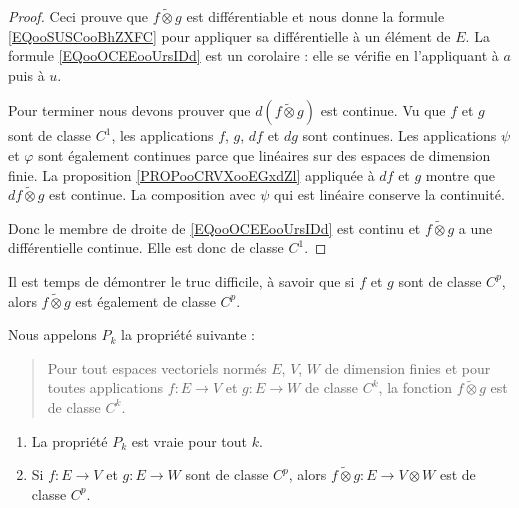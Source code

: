 \begin{proof}
	Ceci prouve que \( f\tilde\otimes g\) est différentiable et nous donne la formule \eqref{EQooSUSCooBhZXFC} pour appliquer sa différentielle à un élément de \( E\). La formule \eqref{EQooOCEEooUrsIDd} est un corolaire : elle se vérifie en l'appliquant à \( a\) puis à \( u\).

	Pour terminer nous devons prouver que \( d(f\tilde\otimes g)\) est continue. Vu que \( f\) et \( g\) sont de classe \( C^1\), les applications \( f\), \( g\), \( df\) et \( dg\) sont continues. Les applications \( \psi\) et \( \varphi\) sont également continues parce que linéaires sur des espaces de dimension finie. La proposition \ref{PROPooCRVXooEGxdZl} appliquée à \( df\) et \( g\) montre que \( df\tilde\otimes g\) est continue. La composition avec \( \psi\) qui est linéaire conserve la continuité.

	Donc le membre de droite de \eqref{EQooOCEEooUrsIDd} est continu et \( f\tilde\otimes g\) a une différentielle continue. Elle est donc de classe \( C^1\).
\end{proof}

Il est temps de démontrer le truc difficile, à savoir que si \( f\) et \( g\) sont de classe \( C^p\), alors \( f\tilde\otimes g\) est également de classe \( C^p\).

\begin{proposition}     \label{PROPooAWZFooMlhoCN}
	Nous appelons \( P_k\) la propriété suivante :
	\begin{quote}
		Pour tout espaces vectoriels normés \( E\), \( V\), \( W\) de dimension finies et pour toutes applications \( f\colon E\to V\) et \( g\colon E\to W\) de classe \( C^k\), la fonction \( f\tilde\otimes g\) est de classe \( C^k\).
	\end{quote}
	\begin{enumerate}
		\item       \label{ITEMooDQRYooAEdxrW}
		      La propriété \( P_k\) est vraie pour tout \( k\).
		\item       \label{ITEMooUUIFooGDyTMM}
		      Si \( f\colon E\to V\) et \( g\colon E\to W\) sont de classe \( C^p\), alors \( f\tilde\otimes g\colon E\to V\otimes W\) est de classe \( C^p\).
	\end{enumerate}
\end{proposition}


